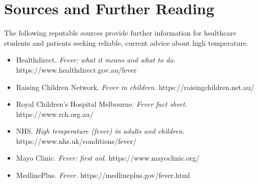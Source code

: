 \section*{Sources and Further Reading}
The following reputable sources provide further information for healthcare students and patients seeking reliable, current advice about high temperature.

\begin{itemize}
    \item Healthdirect. \textit{Fever: what it means and what to do.} https://www.healthdirect.gov.au/fever
    \item Raising Children Network. \textit{Fever in children.} https://raisingchildren.net.au/
    \item Royal Children's Hospital Melbourne. \textit{Fever fact sheet.} https://www.rch.org.au/
    \item NHS. \textit{High temperature (fever) in adults and children.} https://www.nhs.uk/conditions/fever/
    \item Mayo Clinic. \textit{Fever: first aid.} https://www.mayoclinic.org/
    \item MedlinePlus. \textit{Fever.} https://medlineplus.gov/fever.html
\end{itemize}

